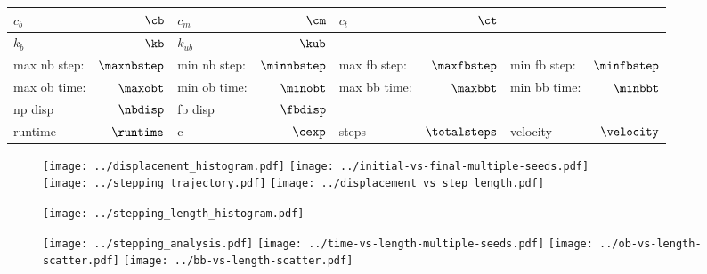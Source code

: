 \documentclass[]{article}
\begin{document}
\begin{table}[tbhp]
  \centering
  \begin{tabular}{|lr|lr|lr|lr|}
    \toprule
    $c_b$ & $\cb$ &
    $c_m$ & $\cm$ &
    $c_t$ & $\ct$ & &\\
    \midrule
    $k_b$ & $\kb$ &
    $k_{ub}$ & $\kub$ & & & &\\
    \midrule
    max nb step: & $\maxnbstep$ &
    min nb step: & $\minnbstep$ &
    max fb step: & $\maxfbstep$ &
    min fb step: & $\minfbstep$\\
    \midrule
    max ob time: & $\maxobt$ &
    min ob time: & $\minobt$ &
    max bb time: & $\maxbbt$ &
    min bb time: & $\minbbt$\\
    \midrule
    np disp & $\nbdisp$ &
    fb disp & $\fbdisp$ & & & &\\
    \midrule
    runtime & $\runtime$ &
    c & $\cexp$ &
    steps & $\totalsteps$ &
    velocity & $\velocity$\\
    \midrule
  \end{tabular}
\end{table}

\begin{figure}[tbhp]
  \centering
  \texttt{[image: ../displacement\_histogram.pdf]}%
  \texttt{[image: ../initial-vs-final-multiple-seeds.pdf]}\\
  \texttt{[image: ../stepping\_trajectory.pdf]}%
  \texttt{[image: ../displacement\_vs\_step\_length.pdf]}
\end{figure}

\begin{figure}[tbhp]
  \texttt{[image: ../stepping\_length\_histogram.pdf]}
\end{figure}

\begin{figure}[tbhp]
  \texttt{[image: ../stepping\_analysis.pdf]}%
  \texttt{[image: ../time-vs-length-multiple-seeds.pdf]}
  \texttt{[image: ../ob-vs-length-scatter.pdf]}%
  \texttt{[image: ../bb-vs-length-scatter.pdf]}
\end{figure}
\end{document}
